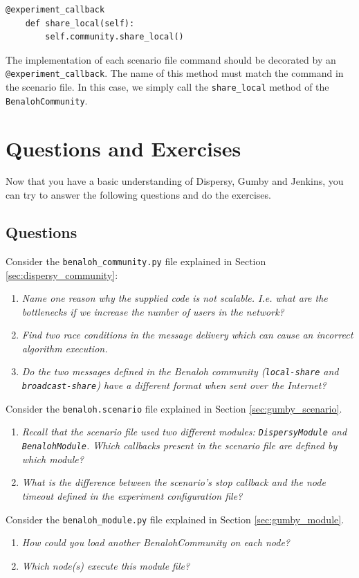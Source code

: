 \documentclass{article}
\begin{document}
\begin{lstlisting}[frame=single]
    @experiment_callback
    def share_local(self):
        self.community.share_local()
\end{lstlisting}

The implementation of each scenario file command should be decorated by an \texttt{@experiment\_callback}.
The name of this method must match the command in the scenario file.
In this case, we simply call the \texttt{share\_local} method of the \texttt{BenalohCommunity}.
\newpage
\section{Questions and Exercises}
Now that you have a basic understanding of Dispersy, Gumby and Jenkins, you can try to answer the following questions and do the exercises.

\subsection{Questions}
Consider the \texttt{benaloh\_community.py} file explained in Section \ref{sec:dispersy_community}:
\begin{enumerate}
	\item \textit{Name one reason why the supplied code is not scalable. I.e. what are the bottlenecks if we increase the number of users in the network?}
	\item \textit{Find two race conditions in the message delivery which can cause an incorrect algorithm execution.}
	\item \textit{Do the two messages defined in the Benaloh community (\texttt{local-share} and \texttt{broadcast-share}) have a different format when sent over the Internet?}
\end{enumerate}
Consider the \texttt{benaloh.scenario} file explained in Section \ref{sec:gumby_scenario}.
\begin{enumerate}
\item \textit{Recall that the scenario file used two different modules: \texttt{DispersyModule} and \texttt{BenalohModule}. Which callbacks present in the scenario file are defined by which module?}
\item \textit{What is the difference between the scenario's \emph{stop} callback and the node timeout defined in the experiment configuration file?}
\end{enumerate}
Consider the \texttt{benaloh\_module.py} file explained in Section \ref{sec:gumby_module}.
\begin{enumerate}
\item \textit{How could you load another BenalohCommunity on each node?}
\item \textit{Which node(s) execute this module file?}
\end{enumerate}
\end{document}
